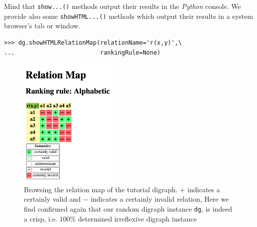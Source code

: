 Mind that \texttt{show...()} methods output their results in the \emph{Python} console. We provide also some \texttt{showHTML...()} methods which output their results in a system browser’s tab or window.
\begin{lstlisting}
>>> dg.showHTMLRelationMap(relationName='r(x,y)',\
...                        rankingRule=None)
\end{lstlisting}
\begin{figure}[ht]
\sidecaption[t]
\includegraphics[width=5cm]{Figures/1-2-relationMap1.png}
\caption[Browsing the relation map of the tutorial digraph]{Browsing the relation map of the tutorial digraph. $+$ indicates a certainly valid and $-$ indicates a certainly  invalid relation, Here we find confirmed again that our random digraph instance \texttt{dg}, is indeed a crisp, i.e. $100\%$ determined irreflexive digraph instance}
\label{fig:1.2}       %
\end{figure}


